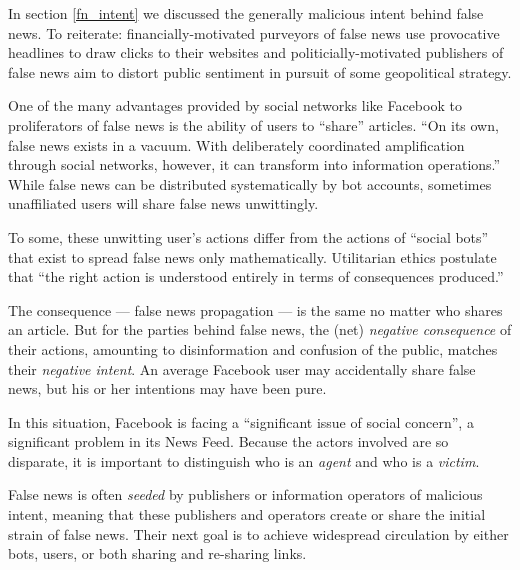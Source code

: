 
\par In section \ref{fn_intent} we discussed the generally malicious intent behind false news. To reiterate: financially-motivated purveyors of false news use provocative headlines to draw clicks to their websites \cite{bbc_clickbait} and politicially-motivated publishers of false news aim to distort public sentiment in pursuit of some geopolitical strategy. \cite{fb_info_ops} 


\par One of the many advantages provided by social networks like Facebook to proliferators of false news is the ability of users to ``share'' articles. \cite{nyt_case_study} ``On its own, false news exists in a vacuum. With deliberately coordinated amplification through social networks, however, it can transform into information operations.'' \cite{fb_info_ops} While false news can be distributed systematically by bot accounts, \cite{cbs_fn} sometimes unaffiliated users will share false news unwittingly. \cite{fb_info_ops}


\par To some, these unwitting user's actions differ from the actions of ``social bots'' that exist to spread false news only mathematically. Utilitarian ethics postulate that ``the right action is understood entirely in terms of consequences produced.'' \cite{util}

\par The consequence --- false news propagation --- is the same no matter who shares an article. But
for the parties behind false news, the (net) \emph{negative consequence} of their actions, amounting to disinformation and confusion of the public, matches their \emph{negative intent}. An average Facebook user may accidentally share false news, but his or her intentions may have been pure.

\par In this situation, Facebook is facing a ``significant issue of social concern'', a significant problem in its News Feed. Because the actors involved are so disparate, it is important to distinguish who is an \emph{agent} and who is a \emph{victim}.


\par False news is often \emph{seeded} by publishers or information operators of malicious intent, meaning that these publishers and operators create or share the initial strain of false news. Their next goal is to achieve widespread circulation by either bots, users, or both sharing and re-sharing links. \cite{fb_info_ops}

